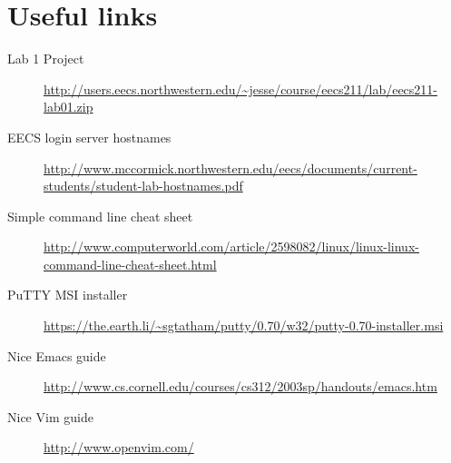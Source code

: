 \documentclass{tufte-handout}
\def\PuTTYurl{https://the.earth.li/~sgtatham/putty/0.70/w32/putty-0.70-installer.msi}
\begin{document}
\section{Useful links}

\begin{description}

  \item[Lab 1 Project]
\url{http://users.eecs.northwestern.edu/~jesse/course/eecs211/lab/eecs211-lab01.zip}

\item[EECS login server hostnames]
\url{http://www.mccormick.northwestern.edu/eecs/documents/current-students/student-lab-hostnames.pdf}

\item[Simple command line cheat sheet]
\url{http://www.computerworld.com/article/2598082/linux/linux-linux-command-line-cheat-sheet.html}

\item[PuTTY MSI installer]
\url{\PuTTYurl}

\item[Nice Emacs guide]
\url{http://www.cs.cornell.edu/courses/cs312/2003sp/handouts/emacs.htm}

\item[Nice Vim guide]
\url{http://www.openvim.com/}

\end{description}
\end{document}
